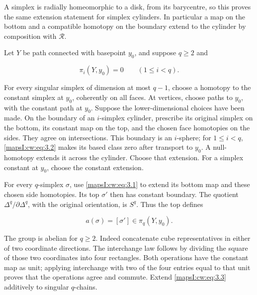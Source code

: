A simplex is radially homeomorphic to a disk, from its barycentre, so this proves the same extension statement for simplex cylinders. In particular a map on the bottom and a compatible homotopy on the boundary extend to the cylinder by composition with \(\mathcal R\).

Let \(Y\) be path connected with basepoint \(y_0\), and suppose \(q\geq2\) and

\begin{equation}
\pi_i(Y,y_0)=0\qquad(1\leq i<q).
\label{mapsI:cw:eq:3.2}
\end{equation}

For every singular simplex of dimension at most \(q-1\), choose a homotopy to the constant simplex at \(y_0\), coherently on all faces. At vertices, choose paths to \(y_0\), with the constant path at \(y_0\). Suppose the lower-dimensional choices have been made. On the boundary of an \(i\)-simplex cylinder, prescribe its original simplex on the bottom, its constant map on the top, and the chosen face homotopies on the sides. They agree on intersections. This boundary is an \(i\)-sphere; for \(1\leq i<q\), \eqref{mapsI:cw:eq:3.2} makes its based class zero after transport to \(y_0\). A null-homotopy extends it across the cylinder. Choose that extension. For a simplex constant at \(y_0\), choose the constant extension.

For every \(q\)-simplex \(\sigma\), use \eqref{mapsI:cw:eq:3.1} to extend its bottom map and these chosen side homotopies. Its top \(\sigma'\) then has constant boundary. The quotient \(\Delta^q/\partial\Delta^q\), with the original orientation, is \(S^q\). Thus the top defines

\begin{equation}
a(\sigma)=[\sigma']\in\pi_q(Y,y_0).
\label{mapsI:cw:eq:3.3}
\end{equation}

The group is abelian for \(q\geq2\). Indeed concatenate cube representatives in either of two coordinate directions. The interchange law follows by dividing the square of those two coordinates into four rectangles. Both operations have the constant map as unit; applying interchange with two of the four entries equal to that unit proves that the operations agree and commute. Extend \eqref{mapsI:cw:eq:3.3} additively to singular \(q\)-chains.

